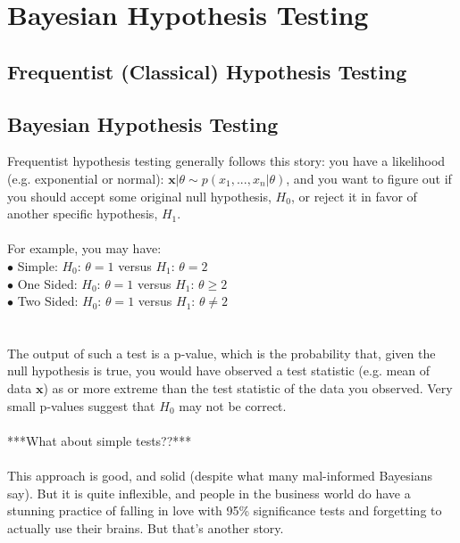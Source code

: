 \documentclass[12pt]{book}
\begin{document}
\chapter{Bayesian Hypothesis Testing}

\section{Frequentist (Classical) Hypothesis Testing}
\section{Bayesian Hypothesis Testing}
Frequentist hypothesis testing generally follows this story: you have a likelihood (e.g. exponential or normal): $\textbf{x}|\theta \sim p(x_1, ..., x_n|\theta)$, and you want to figure out if you should accept some original null hypothesis, $H_0$, or reject it in favor of another specific hypothesis, $H_1$. \\\\
For example, you may have:\\
$\bullet$ Simple: $H_0$: $\theta = 1$ versus $H_1$: $\theta = 2$\\
$\bullet$ One Sided: $H_0$: $\theta = 1$ versus $H_1$: $\theta \geq 2$\\
$\bullet$ Two Sided: $H_0$: $\theta = 1$ versus $H_1$: $\theta \not= 2$\\
\\\\
The output of such a test is a p-value, which is the probability that, given the null hypothesis is true, you would have observed a test statistic (e.g. mean of data $\textbf{x}$) as or more extreme than the test statistic of the data  you observed. Very small p-values suggest that $H_0$ may not be correct.
\\\\
***What about simple tests??***
\\\\
This approach is good, and solid (despite what many mal-informed Bayesians say). But it is quite inflexible, and people in the business world do have a stunning practice of falling in love with 95\% significance tests and forgetting to actually use their brains. But that's another story. 
\\\\
\end{document}
